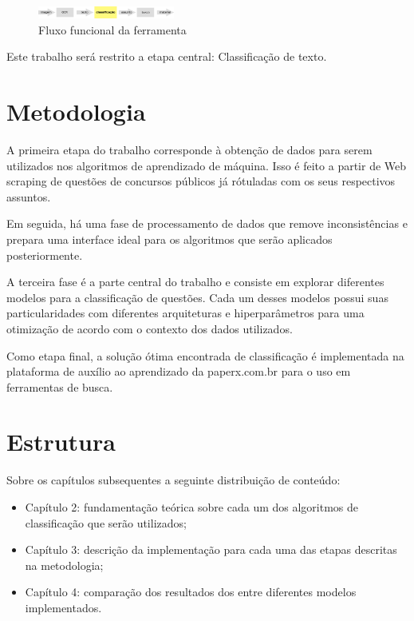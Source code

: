 \begin{figure}[!ht]
	\centering
	\includegraphics[width=0.4\textwidth]{figures/fluxograma.png}   
	\caption{Fluxo funcional da ferramenta}
	\label{fig:fluxograma}
\end{figure}


Este trabalho será restrito a etapa central: Classificação de texto.



\section{Metodologia}
A primeira etapa do trabalho corresponde à obtenção de dados para serem utilizados nos algoritmos de aprendizado de máquina. Isso é feito a partir de Web scraping de questões de concursos públicos já rótuladas com os seus respectivos assuntos.

Em seguida, há uma fase de processamento de dados que remove inconsistências e prepara uma interface ideal para os algoritmos que serão aplicados posteriormente.

A terceira fase é a parte central do trabalho e consiste em explorar diferentes modelos para a classificação de questões. Cada um desses modelos possui suas particularidades com diferentes arquiteturas e hiperparâmetros para uma otimização de acordo com o contexto dos dados utilizados.

Como etapa final, a solução ótima encontrada de classificação é implementada na plataforma de auxílio ao aprendizado da paperx.com.br para o uso em ferramentas de busca.


\section{Estrutura}
Sobre os capítulos subsequentes a seguinte distribuição de conteúdo:
\begin{itemize}
\item Capítulo 2: 
fundamentação teórica sobre cada um dos algoritmos de classificação que serão utilizados;
\item Capítulo 3:
descrição da implementação para cada uma das etapas descritas na metodologia;
\item Capítulo 4:
comparação dos resultados dos entre diferentes modelos implementados.
\end{itemize}